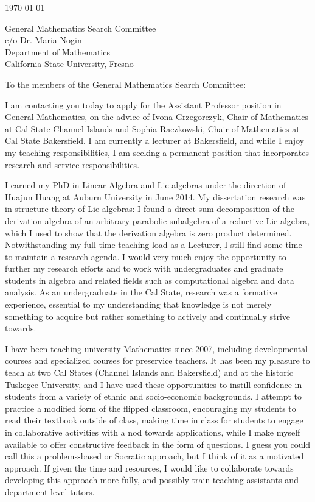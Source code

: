 \documentclass[10pt]{article}
\begin{document}
\makeletterhead

\vfill

\today

\vfill

General Mathematics Search Committee\\
c/o Dr. Maria Nogin\\
Department of Mathematics\\
California State University, Fresno

\vfill

To the members of the General Mathematics Search Committee:

\vfill

I am contacting you today to apply
for the Assistant Professor position
in General Mathematics,
on the advice of Ivona Grzegorczyk,
Chair of Mathematics at Cal State Channel Islands
and Sophia Raczkowski,
Chair of Mathematics at Cal State Bakersfield.
I am currently a lecturer at Bakersfield,
and while I enjoy my teaching responsibilities,
I am seeking a permanent position
that incorporates research
and service responsibilities.

I earned my PhD in Linear Algebra and Lie algebras under the direction
of Huajun Huang at Auburn University in June 2014.
My dissertation research was in structure theory of Lie algebras:
I found a direct sum decomposition of the derivation algebra
of an arbitrary parabolic subalgebra of a reductive Lie algebra,
which I used to show that the derivation algebra
is zero product determined.
Notwithstanding my full-time teaching load as a Lecturer,
I still find some time to maintain a research agenda.
I would very much enjoy the opportunity to further my research efforts
and to work with undergraduates and graduate students
in algebra and related fields
such as computational algebra and data analysis.
As an undergraduate in the Cal State,
research was a formative experience,
essential to my understanding that knowledge
is not merely something to acquire
but rather something to actively and continually strive towards.

I have been teaching university Mathematics since 2007,
including developmental courses and specialized courses for
preservice teachers.
It has been my pleasure to teach at two Cal States
(Channel Islands and Bakersfield) and at the historic
Tuskegee University, and I have used these opportunities to
instill confidence in students from a variety of ethnic and
socio-economic backgrounds.
I attempt to practice a modified form of the flipped classroom,
encouraging my students to read their textbook outside of class,
making time in class for students to engage in collaborative activities
with a nod towards applications, while I make myself available to
offer constructive feedback in the form of questions.
I guess you could call this a problems-based or Socratic approach,
but I think of it as a motivated approach.
If given the time and resources,
I would like to collaborate towards
developing this approach more fully,
and possibly train teaching assistants
and department-level tutors.
\end{document}
